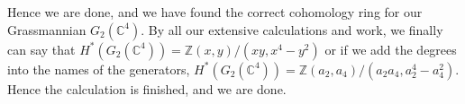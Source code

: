 
Hence we are done, 
and we have found the correct cohomology ring for our Grassmannian $G_2(\mathbb{C}^4)$. 
By all our extensive calculations and work, 
we finally can say that $H^*(G_2(\mathbb{C}^4)) = \mathbb{Z}(x,y)/(xy, x^4-y^2)$ or if we add the degrees into the names of the generators, 
$H^*(G_2(\mathbb{C}^4)) = \mathbb{Z}(a_2, a_4)/(a_2a_4, a_2^4-a_4^2)$. 
Hence the calculation is finished, and we are done. 